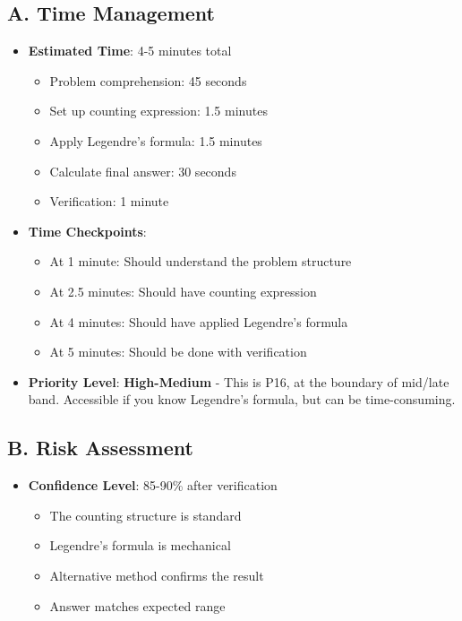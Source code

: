 \documentclass[12pt]{article}
\begin{document}
\begin{competitionbox}
\subsection*{A. Time Management}
\begin{itemize}[leftmargin=*]
    \item \textbf{Estimated Time}: 4-5 minutes total
    \begin{itemize}
        \item Problem comprehension: 45 seconds
        \item Set up counting expression: 1.5 minutes
        \item Apply Legendre's formula: 1.5 minutes
        \item Calculate final answer: 30 seconds
        \item Verification: 1 minute
    \end{itemize}
    
    \item \textbf{Time Checkpoints}: 
    \begin{itemize}
        \item At 1 minute: Should understand the problem structure
        \item At 2.5 minutes: Should have counting expression
        \item At 4 minutes: Should have applied Legendre's formula
        \item At 5 minutes: Should be done with verification
    \end{itemize}
    
    \item \textbf{Priority Level}: \textbf{High-Medium} - This is P16, at the boundary of mid/late band. Accessible if you know Legendre's formula, but can be time-consuming.
\end{itemize}

\subsection*{B. Risk Assessment}
\begin{itemize}[leftmargin=*]
    \item \textbf{Confidence Level}: 85-90\% after verification
    \begin{itemize}
        \item The counting structure is standard
        \item Legendre's formula is mechanical
        \item Alternative method confirms the result
        \item Answer matches expected range
    \end{itemize}
    

\end{itemize}
\end{competitionbox}
\end{document}
